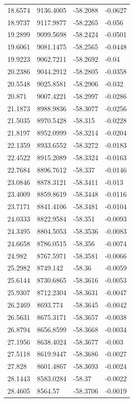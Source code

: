 \begin{table}[H]
\begin{tabular}{llll}
18.6574 & 9136.4005 & -58.2088 & -0.0627 \\
18.9737 & 9117.9877 & -58.2265 & -0.056 \\
19.2899 & 9099.5698 & -58.2424 & -0.0501 \\
19.6061 & 9081.1475 & -58.2565 & -0.0448 \\
19.9223 & 9062.7211 & -58.2692 & -0.04 \\
20.2386 & 9044.2912 & -58.2805 & -0.0358 \\
20.5548 & 9025.8581 & -58.2906 & -0.032 \\
20.871 & 9007.4221 & -58.2997 & -0.0286 \\
21.1873 & 8988.9836 & -58.3077 & -0.0256 \\
21.5035 & 8970.5428 & -58.315 & -0.0228 \\
21.8197 & 8952.0999 & -58.3214 & -0.0204 \\
22.1359 & 8933.6552 & -58.3272 & -0.0183 \\
22.4522 & 8915.2089 & -58.3324 & -0.0163 \\
22.7684 & 8896.7612 & -58.337 & -0.0146 \\
23.0846 & 8878.3121 & -58.3411 & -0.013 \\
23.4009 & 8859.8619 & -58.3448 & -0.0116 \\
23.7171 & 8841.4106 & -58.3481 & -0.0104 \\
24.0333 & 8822.9584 & -58.351 & -0.0093 \\
24.3495 & 8804.5053 & -58.3536 & -0.0083 \\
24.6658 & 8786.0515 & -58.356 & -0.0074 \\
24.982 & 8767.5971 & -58.3581 & -0.0066 \\
25.2982 & 8749.142 & -58.36 & -0.0059 \\
25.6144 & 8730.6865 & -58.3616 & -0.0053 \\
25.9307 & 8712.2304 & -58.3631 & -0.0047 \\
26.2469 & 8693.774 & -58.3645 & -0.0042 \\
26.5631 & 8675.3171 & -58.3657 & -0.0038 \\
26.8794 & 8656.8599 & -58.3668 & -0.0034 \\
27.1956 & 8638.4024 & -58.3677 & -0.003 \\
27.5118 & 8619.9447 & -58.3686 & -0.0027 \\
27.828 & 8601.4867 & -58.3693 & -0.0024 \\
28.1443 & 8583.0284 & -58.37 & -0.0022 \\
28.4605 & 8564.57 & -58.3706 & -0.0019 \\

\end{tabular}
\end{table}
